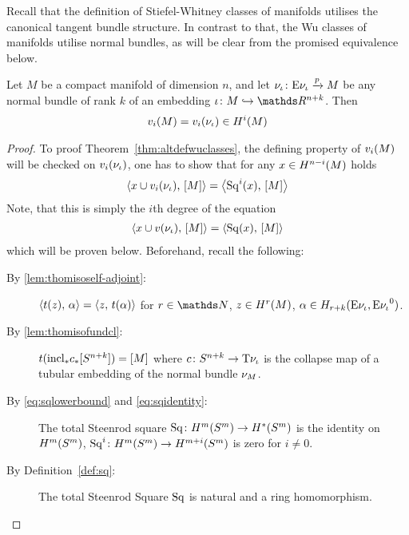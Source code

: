 Recall that the definition of Stiefel-Whitney classes of manifolds
utilises the canonical tangent bundle structure.
In contrast to that, the Wu classes of manifolds utilise normal
bundles, as will be clear from the promised equivalence below.
\begin{Thm}\label{thm:altdefwuclasses}
  Let $M$ be a compact manifold of dimension $n$, and let
  $\nu_{{\iota}}\colon \mathrm{E}\nu_{{\iota}} \xrightarrow{p} M$ be
  any normal bundle of rank $k$ of an embedding
  $\emb\colon M\immto\R^{n+k}$. Then
  \begin{gather*}
    {v_{i}}(M) = {v_{i}}(\nu_{{\iota}})\in H^i(M)
  \end{gather*}
  \begin{proof}
    To proof Theorem~\ref{thm:altdefwuclasses}, the defining property of
    ${v_{i}}(M)$ will be checked on ${v_{i}}(\nu_{{\iota}})$, \idest one has to show
    that for any $x\in H^{n-i}(M)$ holds
    \begin{gather*}
      \left\langle x\cup {v_{i}}(\nu_{{\iota}}),\, [M] \right\rangle
      = \left\langle \mathrm{Sq}^{i}(x),\, [M] \right\rangle
    \end{gather*}
    Note, that this is simply the $i$th degree of the equation
    \begin{gather}\label{eq:proofaltdefwuclasses:claim}
      \left\langle x\cup {v}(\nu_{{\iota}}),\, [M] \right\rangle
      = \left\langle \mathrm{Sq}(x),\, [M] \right\rangle
    \end{gather}
    which will be proven below.
    Beforehand, recall the following:
    \begin{description}
    \item[By \ref{lem:thomisoself-adjoint}:]
      $\left\langle t(z),\, \alpha \right\rangle = \left\langle z,\, t(\alpha) \right\rangle$
      for $r\in\Nat$, $z\in H^r(M)$,
      $\alpha\in H_{r+k}(\mathrm{E}\nu_{{\iota}}, {\mathrm{E}\nu_{{\iota}}}^0)$.
    \item[By \ref{lem:thomisofundcl}:]
      $t({\mathrm{incl}}_*{c}_*[S^{n+k}]) = [M]$
      where $c\colon S^{n+k}\to \mathrm{T}{\nu_{{\iota}}}$ is
      the collapse map of a tubular embedding of the normal bundle $\nu_{M}$.
    \item[By \eqref{eq:sqlowerbound} and \eqref{eq:sqidentity}:]
      The total Steenrod square
      $\mathrm{Sq}\colon H^m(S^{m})
      \to H^*(S^{m})$
      is the identity on $H^m(S^{m})$, \idest
      $\mathrm{Sq}^{i}\colon H^m(S^{m})\to H^{m+i}(S^{m})$ is zero for
      $i\neq0$.
    \item[By Definition~\ref{def:sq}:] The total Steenrod Square
      $\mathrm{Sq}$ is natural and a ring homomorphism.

\end{description}
\end{proof}
\end{Thm}

